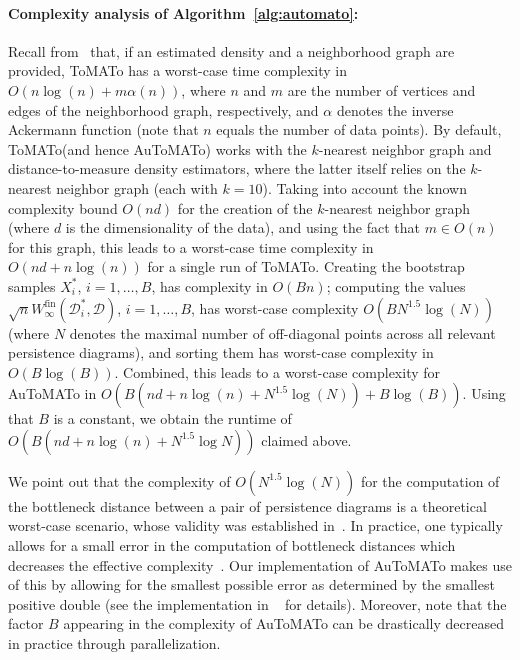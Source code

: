 \documentclass[10pt]{article} %
\theoremstyle{plain}
\newcommand{\DD}{\mathcal{D}}
\newcommand{\aut}{AuToMATo\xspace}
\newcommand{\tom}{ToMATo\xspace}
\newcommand{\bneckfin}[2]{W_{\infty}^{\mathrm{fin}}(#1,#2)}
\begin{document}
\paragraph{Complexity analysis of Algorithm~\ref{alg:automato}:} Recall from~\citet[Section 2]{chazal2013persistence} that, if an estimated density and a neighborhood graph are provided, \tom has a worst-case time complexity in \(O(n\log(n)+m\alpha(n))\), where \(n\) and \(m\) are the number of vertices and edges of the neighborhood graph, respectively, and \(\alpha\) denotes the inverse Ackermann function (note that \(n\) equals the number of data points).
By default, \tom (and hence \aut) works with the \(k\)-nearest neighbor graph and distance-to-measure density estimators, where the latter itself relies on the \(k\)-nearest neighbor graph (each with \(k=10\)). Taking into account the known complexity bound \(O(nd)\) for the creation of the \(k\)-nearest neighbor graph (where \(d\) is the dimensionality of the data), and using the fact that \(m\in O(n)\) for this graph, this leads to a worst-case time complexity in \(O(nd+n\log(n))\) for a single run of \tom. Creating the bootstrap samples \(X_{i}^{*}\), \(i=1,\dots,B\), has complexity in \(O(Bn)\); computing the values \(\sqrt{n}\bneckfin{\DD_{i}^{*}}{\DD}\), \(i=1,\dots,B\), has worst-case complexity \(O(BN^{1.5}\log(N))\) (where $N$ denotes the maximal number of off-diagonal points across all relevant persistence diagrams), and sorting them has worst-case complexity in \(O(B\log(B))\). Combined, this leads to a worst-case complexity for \aut in \(O(B(nd+n\log(n)+N^{1.5}\log(N))+B\log(B))\). Using that \(B\) is a constant, we obtain the runtime of \(O(B(nd+n\log(n)+N^{1.5}\log N))\) claimed above.

We point out that the complexity of \(O(N^{1.5}\log(N))\) for the computation of the bottleneck distance between a pair of persistence diagrams is a theoretical worst-case scenario, whose validity was established in~\cite{Efrat2001}. In practice, one typically allows for a small error in the computation of bottleneck distances which decreases the effective complexity~\citep{kerber_morozov_nigmetov_compare_persistence_diagrams}. Our implementation of \aut makes use of this by allowing for the smallest possible error as determined by the smallest positive double (see the implementation in ~\cite{gudhi:BottleneckDistance} for details).
Moreover, note that the factor \(B\) appearing in the complexity of \aut can be drastically decreased in practice through parallelization.
\end{document}
